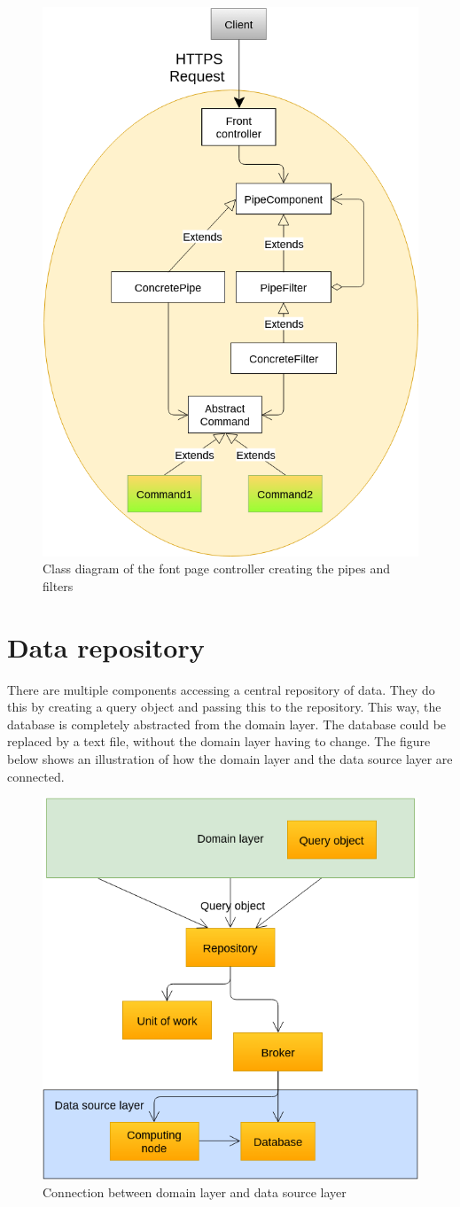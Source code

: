 \begin{figure}[H]
\centering
\includegraphics[width=0.5\linewidth]{7-software/images/FrontClasses.png}
\caption{Class diagram of the font page controller creating the pipes and filters}
\label{fig:frontclasses}
\end{figure}

\section{Data repository}

There are multiple components accessing a central repository of data. They do this by creating a query object and passing this to the repository. This way, the database is completely abstracted from the domain layer. The database could be replaced by a text file, without the domain layer having to change. The figure below shows an illustration of how the domain layer and the data source layer are connected.

\begin{figure}[H]
\centering
\includegraphics[width=0.6\linewidth]{7-software/images/RepoUowBroker.png}
\caption{Connection between domain layer and data source layer}
\label{fig:frontclasses}
\end{figure}

